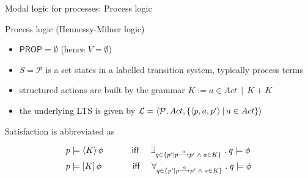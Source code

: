 \documentclass[aspectratio=169]{beamer}
\begin{document}
\begin{slide}{Modal logic for processes: Process logic}\label{s:17}
\small
\begin{block}{Process logic (\alert{Hennessy-Milner logic})}
\begin{itemize}
\item $\mathsf{PROP} = \emptyset$ (hence $V = \emptyset$)
\item $S = \mathcal{P}$ is a set states in a labelled transition system, typically process terms
\item structured actions are built by the grammar \alert{$K := a\in Act~~|~~K+K$}
\item the underlying LTS is given by \alert{$\mathcal{L} = \langle \mathcal{P}, Act, \mathopen{\{} \langle p ,a, p' \rangle \mathbin{|} a \in Act \mathclose{\}} \rangle$}
\end{itemize}
\end{block}
Satisfaction is abbreviated as
\begin{alertblock}{}
  \vspace*{-4mm}
  \begin{align*}
p & \models \langle K \rangle\,{\phi} \text{ ~~~~~~~~ \textsf{iff} ~~~}
\exists_{q \in \mathopen{\{} p' \mathbin{|} p \stackrel{a}{\longrightarrow} p' \; \land\;  a \in K \mathclose{\}}}\; .\; q \models \phi \\
p & \models [K]\,{\phi} \text{~~~~~~~~~~ \textsf{iff} ~~~}
\forall_{q \in \mathopen{\{} p' \mathbin{|} p \stackrel{a}{\longrightarrow} p' \; \land\;  a \in K \mathclose{\}}}\; .\; q \models \phi 
\end{align*}
  \vspace*{-4mm}
\end{alertblock}
\end{slide}



\end{document}
